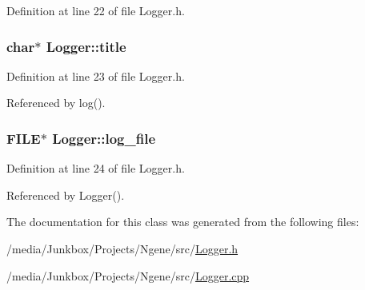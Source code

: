 Definition at line 22 of file Logger.h.\hypertarget{classLogger_2696e84480ff6728cd910a7cccb71eba}{
\subsubsection{\setlength{\rightskip}{0pt plus 5cm}char$\ast$ {\bf Logger::title}}}
\label{classLogger_2696e84480ff6728cd910a7cccb71eba}




Definition at line 23 of file Logger.h.

Referenced by log().\hypertarget{classLogger_acec0f07d337695de096830fe26709ef}{
\subsubsection{\setlength{\rightskip}{0pt plus 5cm}FILE$\ast$ {\bf Logger::log\_\-file}}}
\label{classLogger_acec0f07d337695de096830fe26709ef}




Definition at line 24 of file Logger.h.

Referenced by Logger().

The documentation for this class was generated from the following files:\begin{CompactItemize}
\item 
/media/Junkbox/Projects/Ngene/src/\hyperlink{Logger_8h}{Logger.h}\item 
/media/Junkbox/Projects/Ngene/src/\hyperlink{Logger_8cpp}{Logger.cpp}\end{CompactItemize}
